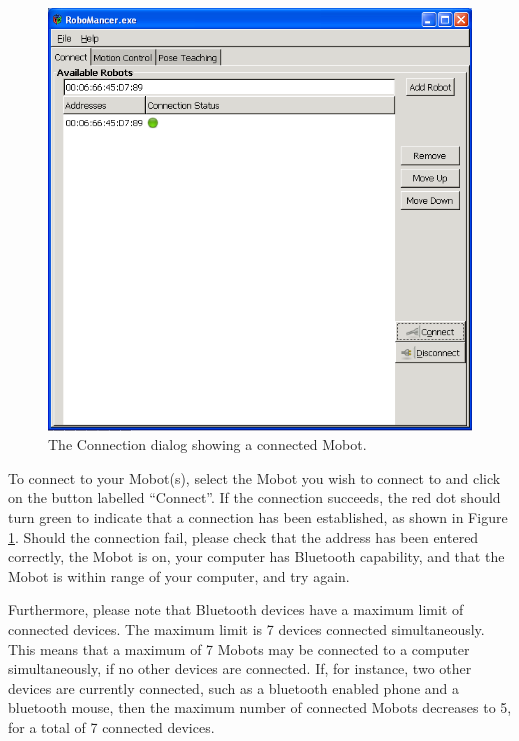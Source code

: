 \documentclass{article}
\begin{document}
\begin{figure}[H]
\begin{center}
\includegraphics[width=4.5in]{images/robomancer_screenshot4.png}
\end{center}
\caption{\label{fig:shot4.png} The Connection dialog showing a connected Mobot.}
\end{figure}

To connect to your Mobot(s), select the Mobot you wish to connect to and click on
the button labelled ``Connect''. If the connection succeeds, the red dot should
turn green to indicate that a connection has been established, as shown in 
Figure \ref{fig:shot4.png}. Should the connection
fail, please check that the address has been entered correctly, the Mobot is on,
your computer has Bluetooth capability, and that the Mobot is within range of 
your computer, and try again.

Furthermore, please note that Bluetooth devices have a maximum limit of connected 
devices. The maximum limit is 7 devices connected simultaneously. This means that 
a maximum of 7 Mobots may be connected to a computer simultaneously, if no
other devices are connected. If, for instance, two other devices are currently 
connected, such as a bluetooth enabled phone and a bluetooth mouse, then the 
maximum number of connected Mobots decreases to 5, for a total of 7 connected 
devices.
\end{document}
